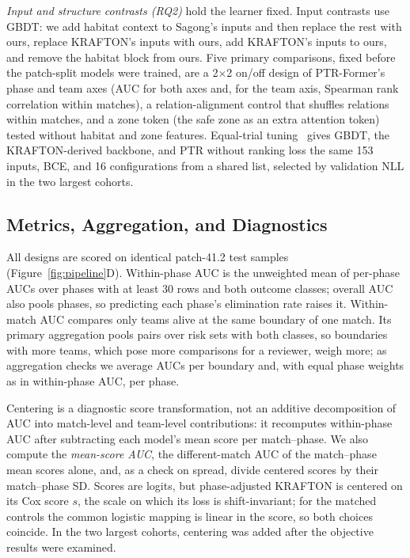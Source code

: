 \documentclass[sigconf,anonymous]{acmart}
\begin{document}
\emph{Input and structure contrasts (RQ2)} hold the learner fixed. Input contrasts use GBDT: we add habitat context to Sagong's inputs and then replace the rest with ours, replace KRAFTON's inputs with ours, add KRAFTON's inputs to ours, and remove the habitat block from ours. Five primary comparisons, fixed before the patch-split models were trained, are a 2$\times$2 on/off design of PTR-Former's phase and team axes (AUC for both axes and, for the team axis, Spearman rank correlation within matches), a relation-alignment control that shuffles relations within matches, and a zone token (the safe zone as an extra attention token) tested without habitat and zone features. Equal-trial tuning~\cite{Bergstra12,Cawley10} gives GBDT, the KRAFTON-derived backbone, and PTR without ranking loss the same 153 inputs, BCE, and 16 configurations from a shared list, selected by validation NLL in the two largest cohorts.

\subsection{Metrics, Aggregation, and Diagnostics}
\label{sec:method:units}
All designs are scored on identical patch-41.2 test samples (Figure~\ref{fig:pipeline}D). Within-phase AUC is the unweighted mean of per-phase AUCs over phases with at least 30 rows and both outcome classes; overall AUC also pools phases, so predicting each phase's elimination rate raises it. Within-match AUC compares only teams alive at the same boundary of one match. Its primary aggregation pools pairs over risk sets with both classes, so boundaries with more teams, which pose more comparisons for a reviewer, weigh more; as aggregation checks we average AUCs per boundary and, with equal phase weights as in within-phase AUC, per phase.

Centering is a diagnostic score transformation, not an additive decomposition of AUC into match-level and team-level contributions: it recomputes within-phase AUC after subtracting each model's mean score per match--phase. We also compute the \emph{mean-score AUC}, the different-match AUC of the match--phase mean scores alone, and, as a check on spread, divide centered scores by their match--phase SD. Scores are logits, but phase-adjusted KRAFTON is centered on its Cox score $s$, the scale on which its loss is shift-invariant; for the matched controls the common logistic mapping is linear in the score, so both choices coincide. In the two largest cohorts, centering was added after the objective results were examined.
\end{document}
